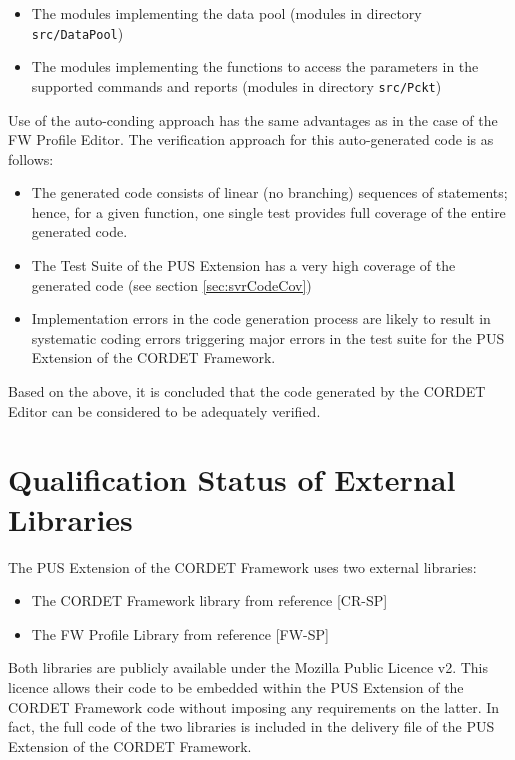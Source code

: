 \documentclass{pnp_article}
\begin{document}
\begin{itemize}
\item The modules implementing the data pool (modules in directory \texttt{src/DataPool})
\item The modules implementing the functions to access the parameters in the supported commands and reports (modules in directory \texttt{src/Pckt})
\end{itemize}

Use of the auto-conding approach has the same advantages as in the case of the FW Profile Editor. The verification approach for this auto-generated code is as follows:

\begin{itemize}
\item The generated code consists of linear (no branching) sequences of statements; hence, for a given function, one single test provides full coverage of the entire generated code.
\item The Test Suite of the PUS Extension has a very high coverage of the generated code (see section \ref{sec:svrCodeCov})
\item Implementation errors in the code generation process are likely to result in systematic coding errors triggering major errors in the test suite for the PUS Extension of the CORDET Framework.
\end{itemize}

Based on the above, it is concluded that the code generated by the CORDET Editor can be considered to be adequately verified.


\section{Qualification Status of External Libraries}\label{sec:svrExtLib}
The PUS Extension of the CORDET Framework uses two external libraries:

\begin{itemize}
\item The CORDET Framework library from reference [CR-SP]
\item The FW Profile Library from reference [FW-SP]
\end{itemize}

Both libraries are publicly available under the Mozilla Public Licence v2. This licence allows their code to be embedded within the PUS Extension of the CORDET Framework code without imposing any requirements on the latter. In fact, the full code of the two libraries is included in the delivery file of the PUS Extension of the CORDET Framework.
\end{document}
